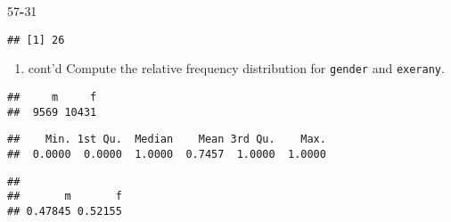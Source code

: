 \documentclass[]{article}
\newenvironment{Shaded}{\begin{snugshade}}{\end{snugshade}}
\newcommand{\KeywordTok}[1]{\textcolor[rgb]{0.13,0.29,0.53}{\textbf{#1}}}
\newcommand{\DecValTok}[1]{\textcolor[rgb]{0.00,0.00,0.81}{#1}}
\newcommand{\StringTok}[1]{\textcolor[rgb]{0.31,0.60,0.02}{#1}}
\newcommand{\OperatorTok}[1]{\textcolor[rgb]{0.81,0.36,0.00}{\textbf{#1}}}
\newcommand{\NormalTok}[1]{#1}
\providecommand{\tightlist}{%
  \setlength{\itemsep}{0pt}\setlength{\parskip}{0pt}}
\begin{document}
\begin{Shaded}
\begin{Highlighting}[]
\DecValTok{57}\OperatorTok{-}\DecValTok{31}
\end{Highlighting}
\end{Shaded}

\begin{verbatim}
## [1] 26
\end{verbatim}

\begin{enumerate}
\def\labelenumi{\arabic{enumi}.}
\setcounter{enumi}{1}
\tightlist
\item
  cont'd Compute the relative frequency distribution for \texttt{gender}
  and \texttt{exerany}.
\end{enumerate}

\begin{Shaded}
\end{Shaded}

\begin{verbatim}
##     m     f 
##  9569 10431
\end{verbatim}

\begin{Shaded}
\end{Shaded}

\begin{verbatim}
##    Min. 1st Qu.  Median    Mean 3rd Qu.    Max. 
##  0.0000  0.0000  1.0000  0.7457  1.0000  1.0000
\end{verbatim}

\begin{Shaded}
\end{Shaded}

\begin{verbatim}
## 
##       m       f 
## 0.47845 0.52155
\end{verbatim}
\end{document}
